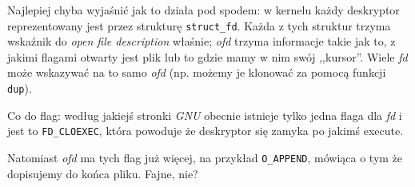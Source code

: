 Najlepiej chyba wyjaśnić jak to działa pod spodem: w kernelu każdy deskryptor reprezentowany jest przez strukturę \texttt{struct\_fd}. Każda z tych struktur trzyma wskaźnik do \textit{open file description} właśnie; \textit{ofd} trzyma informacje takie jak to, z jakimi flagami otwarty jest plik lub to gdzie mamy w nim swój ,,kursor''. Wiele \textit{fd} może wskazywać na to samo \textit{ofd} (np. możemy je klonować za pomocą funkcji \texttt{dup}).

Co do flag: według jakiejś stronki \textit{GNU} obecnie istnieje tylko jedna flaga dla \textit{fd} i jest to \texttt{FD\_CLOEXEC}, która powoduje że deskryptor się zamyka po jakimś execute.

Natomiast \textit{ofd} ma tych flag już więcej, na przykład \texttt{O\_APPEND}, mówiąca o tym że dopisujemy do końca pliku. Fajne, nie?
